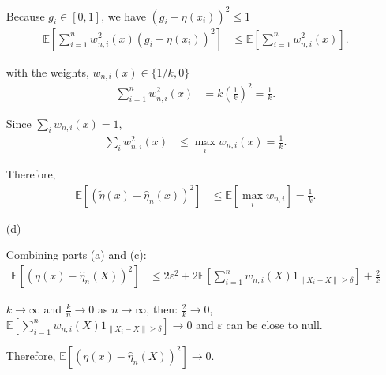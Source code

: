\documentclass[12pt]{article}
\begin{document}
\begin{enumerate}
Because $g_i \in [0,1]$, we have $(g_i - \eta(x_i))^2 \leq 1$ \\
\begin{align*}
\mathbb{E}[\sum_{i=1}^{n} w_{n,i}^2(x)(g_i - \eta(x_i))^2] &\leq \mathbb{E}[\sum_{i=1}^{n} w_{n,i}^2(x)].
\end{align*}

with the weights, $w_{n,i}(x) \in \{1/k, 0\}$
\begin{align*}
\sum_{i=1}^{n} w_{n,i}^2(x) &= k(\frac{1}{k})^2 = \frac{1}{k}.
\end{align*}

Since $\sum_{i} w_{n,i}(x) = 1$,
\begin{align*}
\sum_{i} w_{n,i}^2(x) &\leq \max_{i} w_{n,i}(x) = \frac{1}{k}.
\end{align*}

Therefore,
\begin{align*}
\mathbb{E}[(\tilde{\eta}(x) - \hat{\eta}_n(x))^2] &\leq \mathbb{E}[\max_{i} w_{n,i}] = \frac{1}{k}.
\end{align*}

\item[(d)]

Combining parts (a) and (c):
\begin{align*}
\mathbb{E}[(\eta(x) - \hat{\eta}_n(X))^2] &\leq 2\varepsilon^2 + 2\mathbb{E}[\sum_{i=1}^{n} w_{n,i}(X)1_{\|X_i - X\| \geq \delta}] + \frac{2}{k}
\end{align*}

$k \to \infty$ and $\frac{k}{n} \to 0$ as $n \to \infty$, then:
$\frac{2}{k} \to 0$, $\mathbb{E}[\sum_{i=1}^{n} w_{n,i}(X)1_{\|X_i - X\| \geq \delta}] \to 0$ and $\varepsilon$ can be close to null.

Therefore, $\mathbb{E}[(\eta(x) - \hat{\eta}_n(X))^2] \to 0$.

\end{enumerate}
\end{document}
